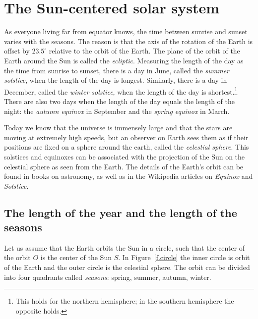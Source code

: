 

\section{The Sun-centered solar system}\label{s.copernicus}

As everyone living far from equator knows, the time between sunrise and sunset varies with the seasons. The reason is that the axis of the rotation of the Earth is offset by $23.5^\circ{}$ relative to the orbit of the Earth. The plane of the orbit of the Earth around the Sun is called the \emph{ecliptic}. Measuring the length of the day as the time from sunrise to sunset, there is a day in June, called the \emph{summer solstice}, when the length of the day is longest. Similarly, there is a day in December, called the \emph{winter solstice}, when the length of the day is shortest.\footnote{This holds for the northern hemisphere; in the southern hemisphere the opposite holds.} There are also two days when the length of the day equals the length of the night: the \emph{autumn equinox} in September and the \emph{spring equinox} in March.

Today we know that the universe is immensely large and that the stars are moving at extremely high speeds, but an observer on Earth sees them as if their positions are fixed on a sphere around the earth, called the \emph{celestial sphere}. This solstices and equinoxes can be associated with the projection of the Sun on the celestial sphere as seen from the Earth. The details of the Earth's orbit can be found in books on astronomy, as well as in the Wikipedia articles on \textit{Equinox} and \textit{Solstice}.

\subsection{The length of the year and the length of the seasons}

Let us assume that the Earth orbits the Sun in a circle, such that the center of the orbit $O$ is the center of the Sun $S$. In Figure~\ref{f.circle} the inner circle is orbit of the Earth and the outer circle is the celestial sphere. The orbit can be divided into four quadrants called \emph{seasons}: spring, summer, autumn, winter.

